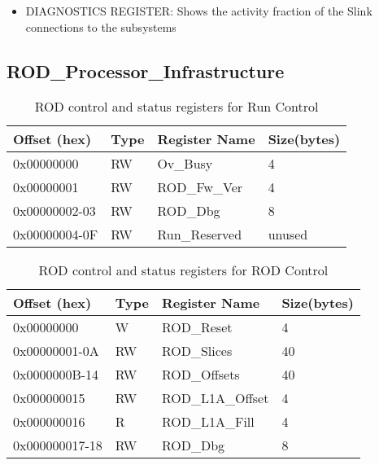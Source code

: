\begin{itemize}
\item DIAGNOSTICS REGISTER: Shows the activity fraction of the Slink connections to the subsystems
\end{itemize}








\subsection{ROD\_Processor\_Infrastructure}
%
\begin {table}[H]
\begin{center}
\caption {ROD control and status registers for Run Control}
\label{rod_control_run}
\begin{tabular}{|l|l|l|l|}
\hline
Offset (hex)& Type & Register Name & Size(bytes)\\
\hline
0x00000000 & RW & Ov\_Busy & 4 \\
\hline
0x00000001 & RW & ROD\_Fw\_Ver & 4 \\
\hline
0x00000002-03 & RW & ROD\_Dbg & 8 \\
\hline
0x00000004-0F & RW & Run\_Reserved & unused \\
\hline
\end{tabular}
\end{center}
\end{table}


\begin {table}[H]
\begin{center}
\caption {ROD control and status registers for ROD Control}
\label{rod_control_run}
\begin{tabular}{|l|l|l|l|}
\hline
Offset (hex)& Type & Register Name & Size(bytes)\\
\hline
0x00000000 & W & ROD\_Reset & 4 \\
\hline
0x00000001-0A & RW & ROD\_Slices & 40 \\
\hline
0x0000000B-14 & RW & ROD\_Offsets & 40 \\
\hline
0x000000015 & RW & ROD\_L1A\_Offset & 4 \\
\hline
0x000000016 & R & ROD\_L1A\_Fill & 4 \\
\hline
0x000000017-18 & RW & ROD\_Dbg & 8 \\
\hline
\end{tabular}
\end{center}
\end{table}


